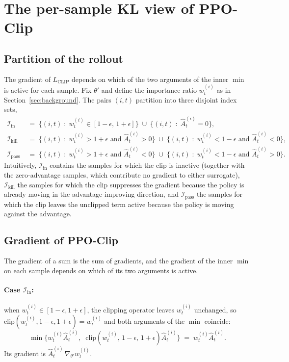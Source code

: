 \documentclass{article}
\begin{document}
\section{The per-sample KL view of PPO-Clip}
\label{sec:theorem}

\subsection{Partition of the rollout}

The gradient of $L_{\mathrm{CLIP}}$ depends on which of the two
arguments of the inner $\min$ is active for each sample. Fix
$\theta'$ and define the importance ratio $w_t^{(i)}$ as in
Section~\ref{sec:background}. The pairs $(i,t)$ partition into three
disjoint index sets,
\begin{align*}
\mathcal{I}_{\mathrm{in}}
  &\;=\;
  \bigl\{(i,t) \;:\; w_t^{(i)} \in [1-\epsilon,\, 1+\epsilon]\bigr\}
  \;\cup\;
  \bigl\{(i,t) \;:\; \hat{A}_t^{(i)} = 0\bigr\}, \\
\mathcal{I}_{\mathrm{kill}}
  &\;=\;
  \bigl\{(i,t) \;:\; w_t^{(i)} > 1+\epsilon \text{ and } \hat{A}_t^{(i)} > 0\bigr\}
  \;\cup\;
  \bigl\{(i,t) \;:\; w_t^{(i)} < 1-\epsilon \text{ and } \hat{A}_t^{(i)} < 0\bigr\}, \\
\mathcal{I}_{\mathrm{pass}}
  &\;=\;
  \bigl\{(i,t) \;:\; w_t^{(i)} > 1+\epsilon \text{ and } \hat{A}_t^{(i)} < 0\bigr\}
  \;\cup\;
  \bigl\{(i,t) \;:\; w_t^{(i)} < 1-\epsilon \text{ and } \hat{A}_t^{(i)} > 0\bigr\}.
\end{align*}
Intuitively, $\mathcal{I}_{\mathrm{in}}$ contains the samples for
which the clip is inactive (together with the zero-advantage samples,
which contribute no gradient to either surrogate), $\mathcal{I}_{\mathrm{kill}}$ the samples
for which the clip suppresses the gradient because the policy is
already moving in the advantage-improving direction, and
$\mathcal{I}_{\mathrm{pass}}$ the samples for which the clip leaves
the unclipped term active because the policy is moving against the
advantage.

\subsection{Gradient of PPO-Clip}

The gradient of a sum is the sum of gradients, and the gradient of
the inner $\min$ on each sample depends on which of its two arguments
is active.

\paragraph{Case $\mathcal{I}_{\mathrm{in}}$:} when $w_t^{(i)} \in
[1-\epsilon, 1+\epsilon]$, the clipping operator leaves $w_t^{(i)}$
unchanged, so $\mathrm{clip}(w_t^{(i)}, 1-\epsilon, 1+\epsilon) =
w_t^{(i)}$ and both arguments of the $\min$ coincide:
\[
\min\!\bigl\{ w_t^{(i)}\hat{A}_t^{(i)},\;\;
              \mathrm{clip}(w_t^{(i)},\,1-\epsilon,\,1+\epsilon)\hat{A}_t^{(i)} \bigr\}
\;=\; w_t^{(i)}\hat{A}_t^{(i)}.
\]
Its gradient is $\hat{A}_t^{(i)}\,\nabla_{\theta'} w_t^{(i)}$.
\end{document}
